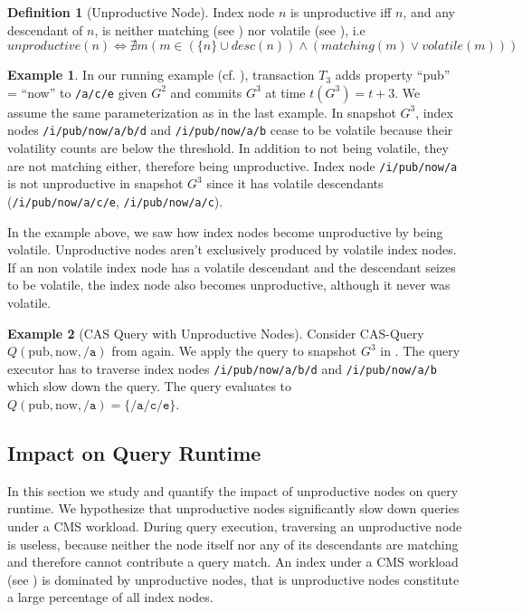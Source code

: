 \message{ !name(thesis.tex)}\documentclass[abstracton,12pt]{scrartcl}
\theoremstyle{definition}
\newtheorem{definition}{Definition}
\newtheorem{example}{Example}
\begin{document}
\begin{definition}[Unproductive Node]
  Index node $n$ is unproductive iff $n$, and any descendant of
  $n$, is neither matching (see ) nor volatile (see
  ), i.e
  $$ unproductive(n) \iff \nexists m (m \in (\{n\} \cup desc(n)) \land
  (matching(m) \lor volatile(m)))$$
\end{definition}

\begin{example}
  In our running example (cf. ), transaction $T_3$ adds
  property ``pub'' = ``now'' to \texttt{/a/c/e} given $G^2$ and commits $G^3$ at time
  $t(G^3) = t+3$. We assume the same parameterization as in the last example.
  In snapshot $G^3$, index nodes \texttt{/i/pub/now/a/b/d} and
  \texttt{/i/pub/now/a/b} cease to be volatile because their 
  volatility counts are below the threshold. In addition to not being volatile,
  they are not matching either, therefore being unproductive. Index node
  \texttt{/i/pub/now/a} is not unproductive in snapshot $G^3$ since it has
  volatile descendants (\texttt{/i/pub/now/a/c/e}, \texttt{/i/pub/now/a/c}). 
\end{example}

In the example above, we saw how index nodes become unproductive by being
volatile. Unproductive nodes aren't exclusively produced by volatile index
nodes. If an non volatile index node has a volatile descendant and the descendant seizes to
be volatile, the index node also becomes unproductive, although it never was
volatile.

\begin{example}[CAS Query with Unproductive Nodes]
  Consider CAS-Query $Q(\text{pub},\text{now},\texttt{/a})$ from
   again. We apply the query to snapshot $G^3$ in
  . The query executor has to traverse index nodes
  \texttt{/i/pub/now/a/b/d} and \texttt{/i/pub/now/a/b} which slow down the
  query. The query evaluates to
  $Q(\text{pub},\text{now},\texttt{/a}) = \{\texttt{/a/c/e}\}$.
\end{example}

\subsection{Impact on Query Runtime}

In this section we study and quantify the impact of unproductive nodes on
query runtime. We hypothesize that unproductive nodes
significantly slow down queries under a CMS workload. During query
execution, traversing an unproductive node is
useless, because neither the node itself nor any of its descendants are matching
and therefore cannot contribute a query match.
An index under a CMS workload (see ) is dominated
by unproductive nodes, that is unproductive nodes constitute a large percentage
of all index nodes.
\end{document}
